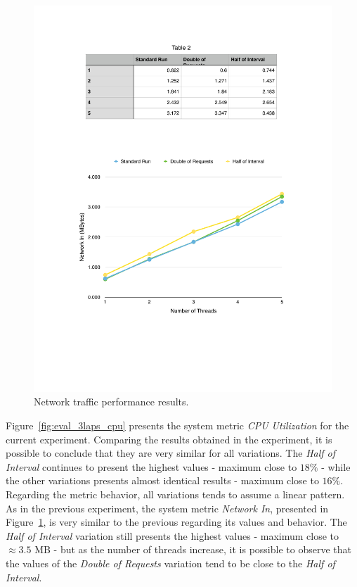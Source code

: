         \begin{figure}[ht!]
          \centering
          \includegraphics[width=.75\textwidth]{./images/network_3_lap}
          \caption{Network traffic performance results.}
          \label{fig:eval_3laps_network}
        \end{figure}

        Figure~\ref{fig:eval_3laps_cpu} presents the system metric \textit{CPU Utilization} for the current
        experiment. Comparing the results obtained in the experiment, it is possible to conclude that
        they are very similar for all variations. The \textit{Half of Interval} continues to present
        the highest values - maximum close to $18\%$ - while the other variations presents almost identical
        results - maximum close to $16\%$. Regarding the metric behavior, all variations tends to assume
        a linear pattern.\\

        As in the previous experiment, the system metric \textit{Network In}, presented in Figure~\ref{fig:eval_3laps_network},
        is very similar to the previous regarding its values and behavior. The \textit{Half of Interval}
        variation still presents the highest values - maximum close to $\approx3.5$ \gls{MB} - but as the number of
        threads increase, it is possible to observe that the values of the \textit{Double of Requests}
        variation tend to be close to the \textit{Half of Interval}.

